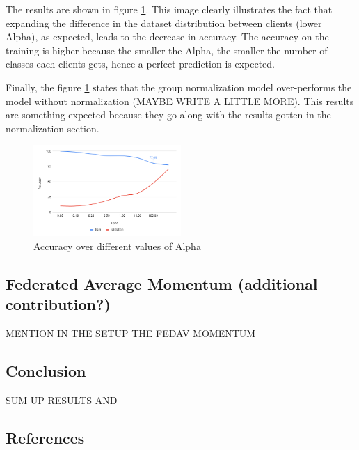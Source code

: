 \documentclass[twocolumn]{article}
\begin{document}
The results are shown in figure \ref{AccAlpha}. This image clearly illustrates the fact that expanding the difference in the dataset distribution between clients (lower Alpha), as expected, leads to the decrease in accuracy. The accuracy on the training is higher because the smaller the Alpha, the smaller the number of classes each clients gets, hence a perfect prediction is expected. 

Finally, the figure \ref{AccAlpha} states that the group normalization model over-performs the model without normalization (MAYBE WRITE A LITTLE MORE). This results are something expected because they go along with the results gotten in the normalization section. 



\begin{figure}
    \centering
    \includegraphics[width=0.5\textwidth,height=.3\textheight]{alphaAccuracy.png}
    \caption{Accuracy over different values of Alpha}
     \label{AccAlpha} 
\end{figure}


\subsection{Federated Average Momentum (additional contribution?)}
MENTION IN THE SETUP THE FEDAV MOMENTUM

\subsection{Conclusion}
SUM UP RESULTS AND 
\subsection{References}
\end{document}
